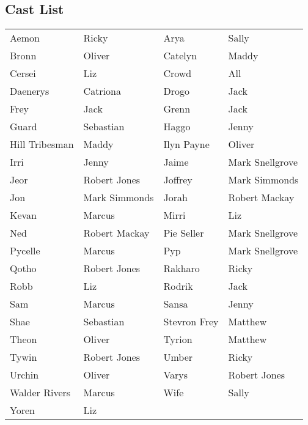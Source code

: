 \subsection*{Cast List}
\begin{tabular}{ll|ll}\\
Aemon & Ricky &  Arya & Sally\\
Bronn & Oliver &  Catelyn & Maddy\\
Cersei & Liz &  Crowd & All\\
Daenerys & Catriona &  Drogo & Jack\\
Frey & Jack &  Grenn & Jack\\
Guard & Sebastian &  Haggo & Jenny\\
Hill Tribesman & Maddy &  Ilyn Payne & Oliver\\
Irri & Jenny &  Jaime & Mark Snellgrove\\
Jeor & Robert Jones &  Joffrey & Mark Simmonds\\
Jon & Mark Simmonds &  Jorah & Robert Mackay\\
Kevan & Marcus &  Mirri & Liz\\
Ned & Robert Mackay &  Pie Seller & Mark Snellgrove\\
Pycelle & Marcus &  Pyp & Mark Snellgrove\\
Qotho & Robert Jones &  Rakharo & Ricky\\
Robb & Liz &  Rodrik & Jack\\
Sam & Marcus &  Sansa & Jenny\\
Shae & Sebastian &  Stevron Frey & Matthew\\
Theon & Oliver &  Tyrion & Matthew\\
Tywin & Robert Jones &  Umber & Ricky\\
Urchin & Oliver &  Varys & Robert Jones\\
Walder Rivers & Marcus &  Wife & Sally\\
Yoren & Liz &  \end{tabular}
